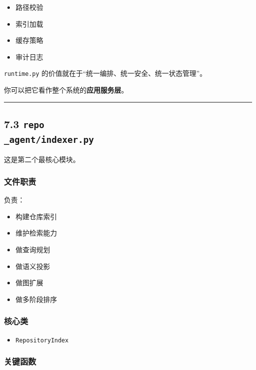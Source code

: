 \documentclass[UTF8,12pt,openany]{ctexbook}
\begin{document}
\begin{itemize}
\item 路径校验
\item 索引加载
\item 缓存策略
\item 审计日志
\end{itemize}

\texttt{runtime.py} 的价值就在于“统一编排、统一安全、统一状态管理”。\par

你可以把它看作整个系统的\textbf{应用服务层}。\par

\hrule

\subsection{7.3 \texttt{repo\\_agent/indexer.py}}

这是第二个最核心模块。\par

\subsubsection{文件职责}

负责：\par

\begin{itemize}
\item 构建仓库索引
\item 维护检索能力
\item 做查询规划
\item 做语义投影
\item 做图扩展
\item 做多阶段排序
\end{itemize}

\subsubsection{核心类}

\begin{itemize}
\item \texttt{RepositoryIndex}
\end{itemize}

\subsubsection{关键函数}
\end{document}

